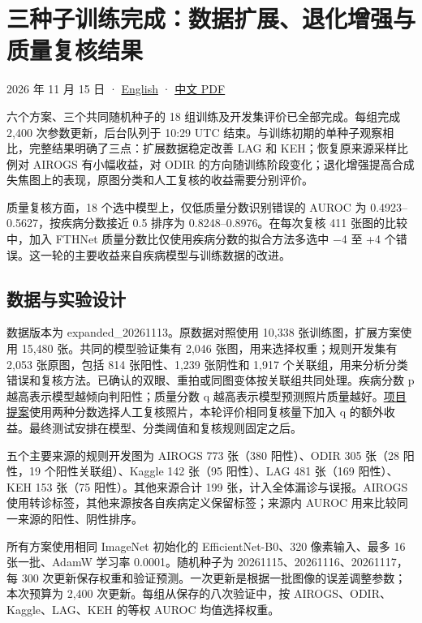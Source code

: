 \documentclass[
  10pt,
]{article}
\author{}
\date{}
\begin{document}
\section{三种子训练完成：数据扩展、退化增强与质量复核结果}\label{ux4e09ux79cdux5b50ux8badux7ec3ux5b8cux6210ux6570ux636eux6269ux5c55ux9000ux5316ux589eux5f3aux4e0eux8d28ux91cfux590dux6838ux7ed3ux679c}

2026 年 11 月 15 日 · \href{completed-results.en.md}{English} ·
\href{completed-results.zh.pdf}{中文 PDF}

六个方案、三个共同随机种子的 18 组训练及开发集评价已全部完成。每组完成
2,400 次参数更新，后台队列于 10:29 UTC
结束。与训练初期的单种子观察相比，完整结果明确了三点：扩展数据稳定改善
LAG 和 KEH；恢复原来源采样比例对 AIROGS 有小幅收益，对 ODIR
的方向随训练阶段变化；退化增强提高合成失焦图上的表现，原图分类和人工复核的收益需要分别评价。

质量复核方面，18 个选中模型上，仅低质量分数识别错误的 AUROC 为
0.4923--0.5627，按疾病分数接近 0.5 排序为 0.8248--0.8976。在每次复核 411
张图的比较中，加入 FTHNet 质量分数比仅使用疾病分数的拟合方法多选中 −4 至
+4 个错误。这一轮的主要收益来自疾病模型与训练数据的改进。

\subsection{数据与实验设计}\label{ux6570ux636eux4e0eux5b9eux9a8cux8bbeux8ba1}

数据版本为 expanded\_20261113。原数据对照使用 10,338
张训练图，扩展方案使用 15,480 张。共同的模型验证集有 2,046
张图，用来选择权重；规则开发集有 2,053 张原图，包括 814 张阳性、1,239
张阴性和 1,917
个关联组，用来分析分类错误和复核方法。已确认的双眼、重拍或同图变体按关联组共同处理。疾病分数
p 越高表示模型越倾向判阳性；质量分数 q
越高表示模型预测照片质量越好。\href{../../../../proposal-1106.pdf}{项目提案}使用两种分数选择人工复核照片，本轮评价相同复核量下加入
q 的额外收益。最终测试安排在模型、分类阈值和复核规则固定之后。

五个主要来源的规则开发图为 AIROGS 773 张（380 阳性）、ODIR 305 张（28
阳性，19 个阳性关联组）、Kaggle 142 张（95 阳性）、LAG 481 张（169
阳性）、KEH 153 张（75 阳性）。其他来源合计 199
张，计入全体漏诊与误报。AIROGS
使用转诊标签，其他来源按各自疾病定义保留标签；来源内 AUROC
用来比较同一来源的阳性、阴性排序。

所有方案使用相同 ImageNet 初始化的 EfficientNet-B0、320 像素输入、最多
16 张一批、AdamW 学习率 0.0001。随机种子为
20261115、20261116、20261117，每 300
次更新保存权重和验证预测。一次更新是根据一批图像的误差调整参数；本次预算为
2,400 次更新。每组从保存的八次验证中，按 AIROGS、ODIR、Kaggle、LAG、KEH
的等权 AUROC 均值选择权重。
\end{document}
